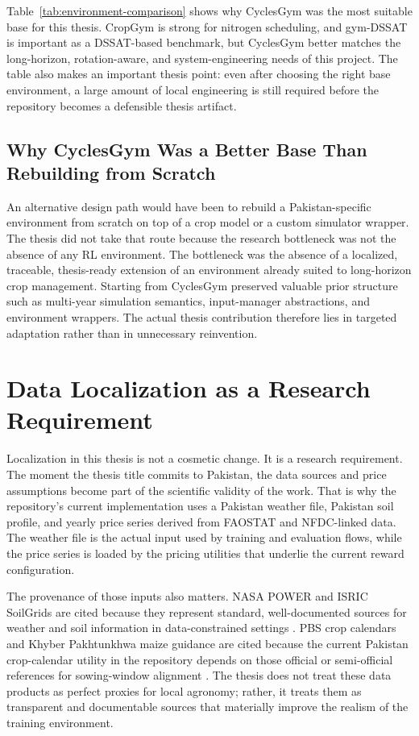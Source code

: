 

Table~\ref{tab:environment-comparison} shows why CyclesGym was the most suitable base for this thesis. CropGym is strong for nitrogen scheduling, and gym-DSSAT is important as a DSSAT-based benchmark, but CyclesGym better matches the long-horizon, rotation-aware, and system-engineering needs of this project. The table also makes an important thesis point: even after choosing the right base environment, a large amount of local engineering is still required before the repository becomes a defensible thesis artifact.

\subsection{Why CyclesGym Was a Better Base Than Rebuilding from Scratch}

An alternative design path would have been to rebuild a Pakistan-specific environment from scratch on top of a crop model or a custom simulator wrapper. The thesis did not take that route because the research bottleneck was not the absence of any RL environment. The bottleneck was the absence of a localized, traceable, thesis-ready extension of an environment already suited to long-horizon crop management. Starting from CyclesGym preserved valuable prior structure such as multi-year simulation semantics, input-manager abstractions, and environment wrappers. The actual thesis contribution therefore lies in targeted adaptation rather than in unnecessary reinvention.

\section{Data Localization as a Research Requirement}

Localization in this thesis is not a cosmetic change. It is a research requirement. The moment the thesis title commits to Pakistan, the data sources and price assumptions become part of the scientific validity of the work. That is why the repository's current implementation uses a Pakistan weather file, Pakistan soil profile, and yearly price series derived from FAOSTAT and NFDC-linked data. The weather file is the actual input used by training and evaluation flows, while the price series is loaded by the pricing utilities that underlie the current reward configuration.

The provenance of those inputs also matters. NASA POWER and ISRIC SoilGrids are cited because they represent standard, well-documented sources for weather and soil information in data-constrained settings \citep{nasapowerdocs,soilgridsdocs}. PBS crop calendars and Khyber Pakhtunkhwa maize guidance are cited because the current Pakistan crop-calendar utility in the repository depends on those official or semi-official references for sowing-window alignment \citep{pbskharifcalendar,pbsrabicalendar,kpmaizeguide}. The thesis does not treat these data products as perfect proxies for local agronomy; rather, it treats them as transparent and documentable sources that materially improve the realism of the training environment.

